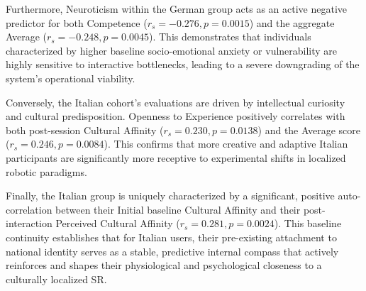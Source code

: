 Furthermore, Neuroticism within the German group acts as an active negative predictor for both Competence ($r_s = -0.276, p = 0.0015$) and the aggregate Average ($r_s = -0.248, p = 0.0045$). This demonstrates that individuals characterized by higher baseline socio-emotional anxiety or vulnerability are highly sensitive to interactive bottlenecks, leading to a severe downgrading of the system's operational viability.

Conversely, the Italian cohort's evaluations are driven by intellectual curiosity and cultural predisposition. Openness to Experience positively correlates with both post-session Cultural Affinity ($r_s = 0.230, p = 0.0138$) and the Average score ($r_s = 0.246, p = 0.0084$). This confirms that more creative and adaptive Italian participants are significantly more receptive to experimental shifts in localized robotic paradigms. 

Finally, the Italian group is uniquely characterized by a significant, positive auto-correlation between their Initial baseline Cultural Affinity and their post-interaction Perceived Cultural Affinity ($r_s = 0.281, p = 0.0024$). This baseline continuity establishes that for Italian users, their pre-existing attachment to national identity serves as a stable, predictive internal compass that actively reinforces and shapes their physiological and psychological closeness to a culturally localized SR.

